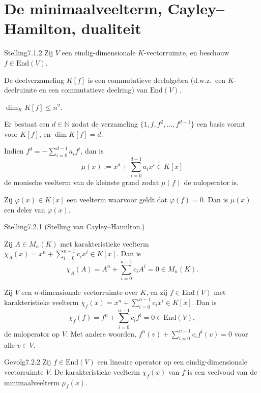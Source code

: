 \section{De minimaalveelterm, Cayley--Hamilton, dualiteit}

\begin{res}{Stelling}{7.1.2}
Zij $V$ een eindig-dimensionale $K$-vectorruimte, en beschouw $f\in\mathrm{End}(V)$.
\begin{myenum}
\item De deelverzameling $K[f]$ is een commutatieve deelalgebra (d.w.z.\ een $K$-deelruimte en een commutatieve deelring) van $\mathrm{End}(V)$.
\item $\dim_K K[f]\le n^2$.
\item Er bestaat een $d\in\mathbb N$ zodat de verzameling $\{1,f,f^2,\dots,f^{d-1}\}$ een basis vormt voor $K[f]$, en $\dim K[f]=d$.
\item Indien $f^d=-\sum_{i=0}^{d-1}a_if^i$, dan is
\[
\mu(x):=x^d+\sum_{i=0}^{d-1}a_ix^i\in K[x]
\]
de monische veelterm van de kleinste graad zodat $\mu(f)$ de nuloperator is.
\item Zij $\varphi(x)\in K[x]$ een veelterm waarvoor geldt dat $\varphi(f)=0$. Dan is $\mu(x)$ een deler van $\varphi(x)$.
\end{myenum}
\end{res}

\begin{res}{Stelling}{7.2.1}
\textup{(Stelling van Cayley--Hamilton.)}
\begin{myenum}
\item Zij $A\in M_n(K)$ met karakteristieke veelterm $\chi_A(x)=x^n+\sum_{i=0}^{n-1}c_ix^i\in K[x]$. Dan is
\[
\chi_A(A)=A^n+\sum_{i=0}^{n-1}c_iA^i=0\in M_n(K).
\]
\item Zij $V$ een $n$-dimensionale vectorruimte over $K$, en zij $f\in\mathrm{End}(V)$ met karakteristieke veelterm $\chi_f(x)=x^n+\sum_{i=0}^{n-1}c_ix^i\in K[x]$. Dan is
\[
\chi_f(f)=f^n+\sum_{i=0}^{n-1}c_if^i=0\in\mathrm{End}(V),
\]
de nuloperator op $V$. Met andere woorden, $f^n(v)+\sum_{i=0}^{n-1}c_if^i(v)=0$ voor alle $v\in V$.
\end{myenum}
\end{res}

\begin{res}{Gevolg}{7.2.2}
Zij $f\in\mathrm{End}(V)$ een lineaire operator op een eindig-dimensionale vectorruimte $V$. De karakteristieke veelterm $\chi_f(x)$ van $f$ is een veelvoud van de minimaalveelterm $\mu_f(x)$.
\end{res}

